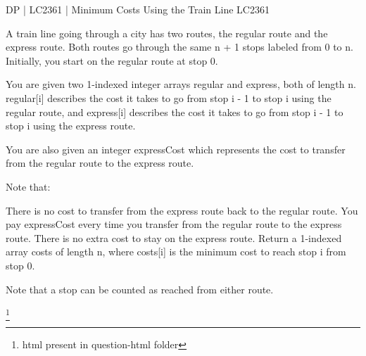 \begin{problem}{DP | LC2361 | Minimum Costs Using the Train Line
    }
    LC2361

    A train line going through a city has two routes, the regular route and the express route. Both routes go through the same n + 1 stops labeled from 0 to n. Initially, you start on the regular route at stop 0.

You are given two 1-indexed integer arrays regular and express, both of length n. regular[i] describes the cost it takes to go from stop i - 1 to stop i using the regular route, and express[i] describes the cost it takes to go from stop i - 1 to stop i using the express route.

You are also given an integer expressCost which represents the cost to transfer from the regular route to the express route.

Note that:

There is no cost to transfer from the express route back to the regular route.
You pay expressCost every time you transfer from the regular route to the express route.
There is no extra cost to stay on the express route.
Return a 1-indexed array costs of length n, where costs[i] is the minimum cost to reach stop i from stop 0.

Note that a stop can be counted as reached from either route.

\footnote{html present in question-html folder}
\end{problem}

